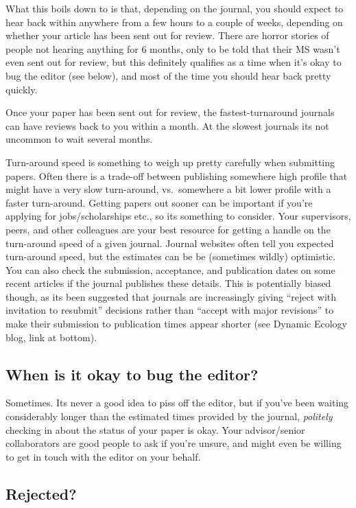 \documentclass[11pt,]{article}
\begin{document}
What this boils down to is that, depending on the journal, you should
expect to hear back within anywhere from a few hours to a couple of
weeks, depending on whether your article has been sent out for review.
There are horror stories of people not hearing anything for 6 months,
only to be told that their MS wasn't even sent out for review, but this
definitely qualifies as a time when it's okay to bug the editor (see
below), and most of the time you should hear back pretty quickly.

Once your paper has been sent out for review, the fastest-turnaround
journals can have reviews back to you within a month. At the slowest
journals its not uncommon to wait several months.

Turn-around speed is something to weigh up pretty carefully when
submitting papers. Often there is a trade-off between publishing
somewhere high profile that might have a very slow turn-around,
vs.~somewhere a bit lower profile with a faster turn-around. Getting
papers out sooner can be important if you're applying for
jobs/scholarships etc., so its something to consider. Your supervisors,
peers, and other colleagues are your best resource for getting a handle
on the turn-around speed of a given journal. Journal websites often tell
you expected turn-around speed, but the estimates can be be (sometimes
wildly) optimistic. You can also check the submission, acceptance, and
publication dates on some recent articles if the journal publishes these
details. This is potentially biased though, as its been suggested that
journals are increasingly giving ``reject with invitation to resubmit''
decisions rather than ``accept with major revisions'' to make their
submission to publication times appear shorter (see Dynamic Ecology
blog, link at bottom).

\subsection{When is it okay to bug the
editor?}\label{when-is-it-okay-to-bug-the-editor}

Sometimes. Its never a good idea to piss off the editor, but if you've
been waiting considerably longer than the estimated times provided by
the journal, \emph{politely} checking in about the status of your paper
is okay. Your advisor/senior collaborators are good people to ask if
you're unsure, and might even be willing to get in touch with the editor
on your behalf.

\subsection{Rejected?}\label{rejected}
\end{document}
